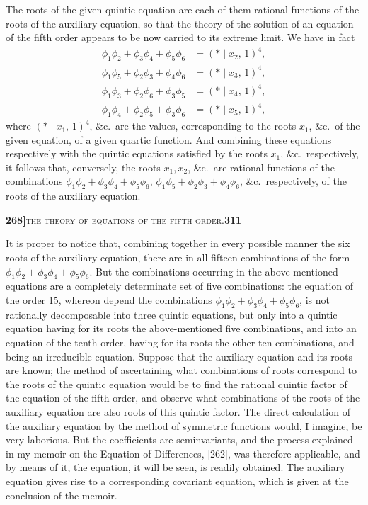 \documentclass[11pt]{article}
\newcommand{\Cdel}{\mid}
\begin{document}
\noindent The roots of the given quintic equation are each of them rational functions of the roots of the auxiliary equation, so that the theory of the solution of an equation of the fifth order appears to be now carried to its extreme limit. We have in fact
\[
\begin{aligned}
   \phi_1\phi_2 + \phi_3\phi_4 + \phi_5\phi_6 &= (*\Cdel x_2,\,1)^4,\\
   \phi_1\phi_5 + \phi_2\phi_3 + \phi_4\phi_6 &= (*\Cdel x_3,\,1)^4,\\
   \phi_1\phi_3 + \phi_2\phi_6 + \phi_3\phi_5 &= (*\Cdel x_4,\,1)^4,\\
   \phi_1\phi_4 + \phi_2\phi_5 + \phi_3\phi_6 &= (*\Cdel x_5,\,1)^4,
\end{aligned}
\]
where $(*\Cdel x_1,\,1)^4$, \&c.\ are the values, corresponding to the roots $x_1$, \&c.\ of the given equation, of a given quartic function. And combining these equations respectively with the quintic equations satisfied by the roots $x_1$, \&c.\ respectively, it follows that, conversely, the roots $x_1, x_2$, \&c.\ are rational functions of the combinations $\phi_1\phi_2 + \phi_3\phi_4 + \phi_5\phi_6$, $\phi_1\phi_5 + \phi_2\phi_3 + \phi_4\phi_6$, \&c.\ respectively, of the roots of the auxiliary equation.

\newpage
\setcounter{page}{311}

\noindent\textbf{268]}\hfill\textsc{the theory of equations of the fifth order.}\hfill\textbf{311}

\medskip

\noindent It is proper to notice that, combining together in every possible manner the six roots of the auxiliary equation, there are in all fifteen combinations of the form $\phi_1\phi_2 + \phi_3\phi_4 + \phi_5\phi_6$. But the combinations occurring in the above-mentioned equations are a completely determinate set of five combinations: the equation of the order 15, whereon depend the combinations $\phi_1\phi_2 + \phi_3\phi_4 + \phi_5\phi_6$, is not rationally decomposable into three quintic equations, but only into a quintic equation having for its roots the above-mentioned five combinations, and into an equation of the tenth order, having for its roots the other ten combinations, and being an irreducible equation. Suppose that the auxiliary equation and its roots are known; the method of ascertaining what combinations of roots correspond to the roots of the quintic equation would be to find the rational quintic factor of the equation of the fifth order, and observe what combinations of the roots of the auxiliary equation are also roots of this quintic factor. The direct calculation of the auxiliary equation by the method of symmetric functions would, I imagine, be very laborious. But the coefficients are seminvariants, and the process explained in my memoir on the Equation of Differences, [262], was therefore applicable, and by means of it, the equation, it will be seen, is readily obtained. The auxiliary equation gives rise to a corresponding covariant equation, which is given at the conclusion of the memoir.
\end{document}
